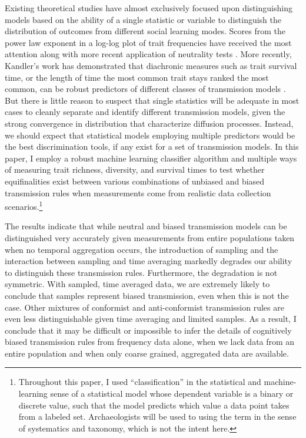 \documentclass[10pt,letterpaper]{article}
\begin{document}
Existing theoretical studies have almost exclusively focused upon distinguishing
models based on the ability of a single statistic or variable to
distinguish the distribution of outcomes from different social learning
modes. Scores from the power law exponent
in a log-log plot of trait frequencies have received the most attention along with more recent application of neutrality tests \cite{Bentley2003, bentley2004random, Mesoudi2009, slatkin1994exact, slatkin1996correction}.   
More recently, Kandler's work has demonstrated that diachronic measures such
as trait survival time, or the length of time the most common trait
stays ranked the most common, can be robust predictors of different
classes of transmission models
\cite{kandler2013non, wilderkandler2015}. 
But there is little reason to suspect that single statistics will be adequate in most cases to cleanly separate and identify different transmission models, given the strong convergence in distribution that characterize diffusion processes.  Instead, we should expect that statistical models employing multiple predictors would be the best discrimination tools, if any exist for a set of transmission models.  In this paper, I employ
a robust machine learning classifier algorithm and multiple ways of measuring
trait richness, diversity, and survival times to test whether
equifinalities exist between various combinations of unbiased and biased
transmission rules when measurements come from realistic data collection
scenarios.\footnote{Throughout this paper, I used ``classification'' in the statistical and machine-learning sense of a statistical model whose dependent variable is a binary or discrete value, such that the model predicts which value a data point takes from a labeled set.  Archaeologists will be used to using the term in the sense of systematics and taxonomy, which is not the intent here.}

The results indicate that while neutral and biased transmission models
can be distinguished very accurately given measurements from entire
populations taken when no temporal aggregation occurs, the introduction of
sampling and the interaction between sampling and time averaging
 markedly degrades our ability to distinguish these transmission
rules. Furthermore, the degradation is not symmetric. With sampled, time
averaged data, we are extremely likely to conclude that samples
represent biased transmission, even when this is not the case. Other
mixtures of conformist and anti-conformist transmission rules are even
less distinguishable given time averaging and limited samples.  As a result, I conclude that it may be difficult or impossible to infer the details of cognitively biased transmission rules from frequency data alone, when we lack data from an entire population and when only coarse grained, aggregated data are available.
\end{document}
